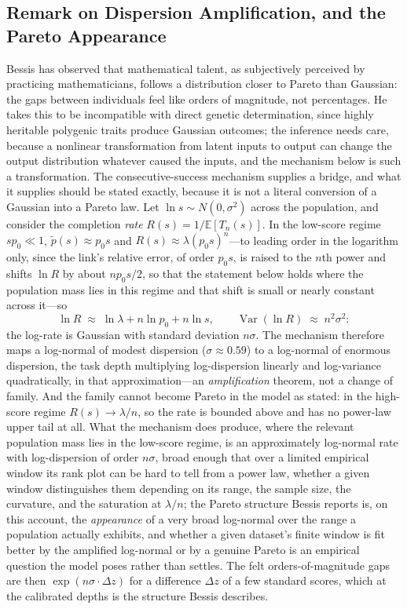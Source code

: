 \documentclass{article}
\begin{document}
\subsection{Remark on Dispersion Amplification, and the Pareto Appearance}\label{ssec:pareto}
Bessis \cite{bessis2024mathematica, bessis2025genes, bessis2026jaimungal} has observed that mathematical talent, as subjectively perceived by practicing mathematicians, follows a distribution closer to Pareto than Gaussian: the gaps between individuals feel like orders of magnitude, not percentages. He takes this to be incompatible with direct genetic determination, since highly heritable polygenic traits produce Gaussian outcomes; the inference needs care, because a nonlinear transformation from latent inputs to output can change the output distribution whatever caused the inputs, and the mechanism below is such a transformation. The consecutive-success mechanism supplies a bridge, and what it supplies should be stated exactly, because it is not a literal conversion of a Gaussian into a Pareto law. Let $\ln s \sim N(0, \sigma^2)$ across the population, and consider the completion \emph{rate} $R(s) = 1/\mathbb{E}[T_n(s)]$. In the low-score regime $s p_0 \ll 1$, $\widetilde{p}(s) \approx p_0 s$ and $R(s) \approx \lambda (p_0 s)^{n}$---to leading order in the logarithm only, since the link's relative error, of order $p_0 s$, is raised to the $n$th power and shifts $\ln R$ by about $n p_0 s/2$, so that the statement below holds where the population mass lies in this regime and that shift is small or nearly constant across it---so
\begin{equation}\label{eq:dispersion}
\ln R \;\approx\; \ln\lambda + n \ln p_0 + n \ln s, \qquad \operatorname{Var}(\ln R) \;\approx\; n^{2} \sigma^{2}:
\end{equation}
the log-rate is Gaussian with standard deviation $n\sigma$. The mechanism therefore maps a log-normal of modest dispersion ($\sigma \approx 0.59$) to a log-normal of enormous dispersion, the task depth multiplying log-dispersion linearly and log-variance quadratically, in that approximation---an \emph{amplification} theorem, not a change of family. And the family cannot become Pareto in the model as stated: in the high-score regime $R(s) \to \lambda/n$, so the rate is bounded above and has no power-law upper tail at all. What the mechanism does produce, where the relevant population mass lies in the low-score regime, is an approximately log-normal rate with log-dispersion of order $n\sigma$, broad enough that over a limited empirical window its rank plot can be hard to tell from a power law, whether a given window distinguishes them depending on its range, the sample size, the curvature, and the saturation at $\lambda/n$; the Pareto structure Bessis reports is, on this account, the \emph{appearance} of a very broad log-normal over the range a population actually exhibits, and whether a given dataset's finite window is fit better by the amplified log-normal or by a genuine Pareto is an empirical question the model poses rather than settles. The felt orders-of-magnitude gaps are then $\exp(n\sigma \cdot \Delta z)$ for a difference $\Delta z$ of a few standard scores, which at the calibrated depths is the structure Bessis describes.
\end{document}
